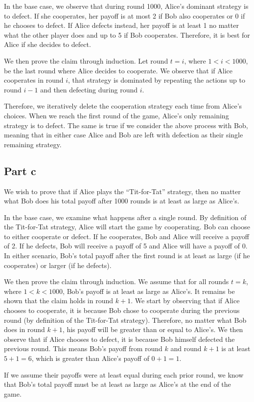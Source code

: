 \documentclass[12pt]{article}%
\begin{document}
In the base case, we observe that during round 1000, Alice's dominant strategy is to defect. If she cooperates, her payoff is at most 2 if Bob also cooperates or 0 if he chooses to defect. If Alice defects instead, her payoff is at least 1 no matter what the other player does and up to 5 if Bob cooperates. Therefore, it is best for Alice if she decides to defect.

We then prove the claim through induction. Let round $t = i$, where $1 < i < 1000$, be the last round where Alice decides to cooperate. We observe that if Alice cooperates in round $i$, that strategy is dominated by repeating the actions up to round $i - 1$ and then defecting during round $i$.

Therefore, we iteratively delete the cooperation strategy each time from Alice's choices. When we reach the first round of the game, Alice's only remaining strategy is to defect. The same is true if we consider the above process with Bob, meaning that in either case Alice and Bob are left with defection as their single remaining strategy.

\subsection*{Part c}
We wish to prove that if Alice plays the “Tit-for-Tat” strategy, then no matter what Bob does his total payoff after 1000 rounds is at least as large as Alice’s.

In the base case, we examine what happens after a single round. By definition of the Tit-for-Tat strategy, Alice will start the game by cooperating. Bob can choose to either cooperate or defect. If he cooperates, Bob and Alice will receive a payoff of 2. If he defects, Bob will receive a payoff of 5 and Alice will have a payoff of 0. In either scenario, Bob's total payoff after the first round is at least as large (if he cooperates) or larger (if he defects).

We then prove the claim through induction. We assume that for all rounds $t = k$, where $1 < k < 1000$, Bob's payoff is at least as large as Alice’s. It remains be shown that the claim holds in round $k + 1$. We start by observing that if Alice chooses to cooperate, it is because Bob chose to cooperate during the previous round (by definition of the Tit-for-Tat strategy). Therefore, no matter what Bob does in round $k + 1$, his payoff will be greater than or equal to Alice's. We then observe that if Alice chooses to defect, it is because Bob himself defected the previous round. This means Bob's payoff from round $k$ and round $k + 1$ is at least $5 + 1 = 6$, which is greater than Alice's payoff of $0 + 1 = 1$.

If we assume their payoffs were at least equal during each prior round, we know that Bob's total payoff must be at least as large as Alice's at the end of the game.
\end{document}
